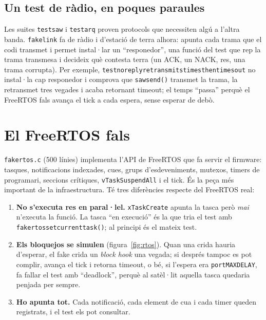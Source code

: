 \documentclass[11pt,a4paper]{article}
\DeclareRobustCommand{\_}{\textunderscore\allowbreak}
\newcommand{\cd}[1]{\texttt{#1}}
\begin{document}
\subsection{Un test de ràdio, en poques paraules}

Les suites \cd{test\_saw} i \cd{test\_arq} proven protocols que necessiten algú a l'altra
banda. \cd{fake\_link} fa de ràdio i d'estació de terra alhora: apunta cada trama que el
codi transmet i permet instal·lar un ``responedor'', una funció del test que rep la trama
transmesa i decideix què contesta terra (un ACK, un NACK, res, una trama corrupta).
Per exemple, \cd{test\_no\_reply\_retransmits\_3\_times\_then\_times\_out} no instal·la cap
responedor i comprova que \cd{saw\_send()} transmet la trama, la retransmet tres vegades i
acaba retornant timeout; el temps ``passa'' perquè el FreeRTOS fals avança el tick a cada
espera, sense esperar de debò.

\clearpage
\section{El FreeRTOS fals}\label{sec:rtos}

\cd{fake\_rtos.c} (500 línies) implementa l'API de FreeRTOS que fa servir el firmware:
tasques, notificacions indexades, cues, grups d'esdeveniments, mutexos, timers de
programari, seccions crítiques, \cd{vTaskSuspendAll} i el tick. És la peça més important
de la infraestructura. Té tres diferències respecte del FreeRTOS real:

\begin{enumerate}
\item \textbf{No s'executa res en paral·lel.} \cd{xTaskCreate} apunta la tasca però
  \emph{mai} n'executa la funció. La tasca ``en execució'' és la que tria el test amb
  \cd{fake\_rtos\_set\_current\_task()}; al principi és el mateix test.
\item \textbf{Els bloquejos se simulen} (figura~\ref{fig:rtos}). Quan una crida hauria
  d'esperar, el fake crida un \emph{block hook} una vegada; si després tampoc es pot
  complir, avança el tick i retorna timeout, o bé, si l'espera era \cd{portMAX\_DELAY}, fa
  fallar el test amb ``deadlock'', perquè al satèl·lit aquella tasca quedaria penjada per
  sempre.
\item \textbf{Ho apunta tot.} Cada notificació, cada element de cua i cada timer queden
  registrats, i el test els pot consultar.
\end{enumerate}
\end{document}

